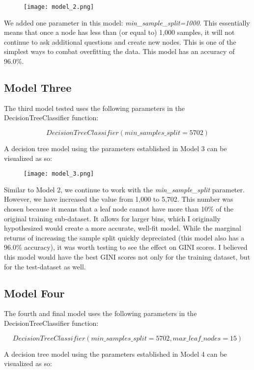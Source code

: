 \documentclass[notitlepage]{report}
\begin{document}
\begin{figure}[H]
	\centering
	\texttt{[image: model\_2.png]}
\end{figure}

We added one parameter in this model: \textit{min\_sample\_split=1000}. This essentially means that once a node has less than (or equal to) 1,000 samples, it will not continue to ask additional questions and create new nodes. This is one of the simplest ways to combat overfitting the data. This model has an accuracy of 96.0\%.

\subsection*{Model Three}
The third model tested uses the following parameters in the DecisionTreeClassifier function:

$$
DecisionTreeClassifier(min\_samples\_split=5702)
$$

A decision tree model using the parameters established in Model 3 can be visualized as so:

\begin{figure}[H]
	\centering
	\texttt{[image: model\_3.png]}
\end{figure}

Similar to Model 2, we continue to work with the \textit{min\_sample\_split} parameter. However, we have increased the value from 1,000 to 5,702. This number was chosen because it means that a leaf node cannot have more than 10\% of the original training sub-dataset. It allows for larger bins, which I originally hypothesized would create a more accurate, well-fit model. While the marginal returns of increasing the sample split quickly depreciated (this model also has a 96.0\% accuracy), it was worth testing to see the effect on GINI scores. I believed this model would have the best GINI scores not only for the training dataset, but for the test-dataset as well.

\subsection*{Model Four}
The fourth and final model uses the following parameters in the DecisionTreeClassifier function:

$$
DecisionTreeClassifier(min\_samples\_split=5702, max\_leaf\_nodes=15)
$$

A decision tree model using the parameters established in Model 4 can be visualized as so:
\end{document}
